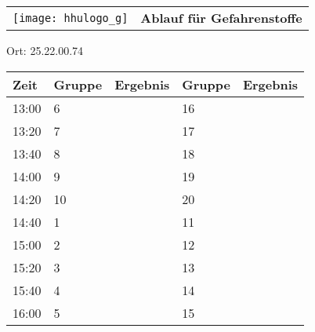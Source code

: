 \documentclass[a4paper,10pt]{article}
\def\spielf{Gefahrenstoffe}
\def\raumf{25.22.00.74}
\begin{document}
   \newpage
  \begin{tabularx}{\textwidth}{lc}
    \texttt{[image: hhulogo\_g]}
  & {\Huge \textbf{Ablauf für \spielf}}
  \end{tabularx}
  \LARGE
  \begin{center}
    \vspace{1cm} 
    Ort: \raumf
  \end{center}
    \vspace{2cm} 
    \begin{tabularx}{\textwidth}{X||X|X||X|X}
	\textbf{Zeit} &\textbf{Gruppe} & \textbf{Ergebnis} &\textbf{Gruppe} & \textbf{Ergebnis}  	\\ \hline \hline
	13:00 &	6	&	&16	&	\\ \hline
	13:20 &	7	&	&17	&	\\ \hline
	13:40 &	8	&	&18	&	\\ \hline

	14:00 &	9	&	&19	&	\\ \hline
	14:20 &	10	&	&20	&	\\ \hline
	14:40 &	1	&	&11	&	\\ \hline

	15:00 &	2	&	&12	&	\\ \hline
	15:20 &	3	&	&13	&	\\ \hline
	15:40 &	4	&	&14	&	\\ \hline

	16:00 &	5	&	&15	&	\\ \hline
      
    \end{tabularx}
   
\end{document}
